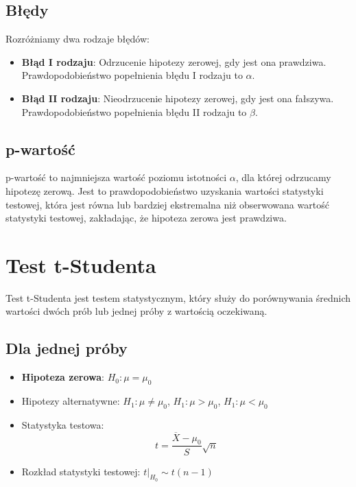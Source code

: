 \documentclass{../notatki}
\begin{document}
\subsection{Błędy}

Rozróżniamy dwa rodzaje błędów:
\begin{itemize}
  \item \textbf{Błąd I rodzaju}: Odrzucenie hipotezy zerowej, gdy jest ona
    prawdziwa. Prawdopodobieństwo popełnienia błędu I rodzaju to $\alpha$.
  \item \textbf{Błąd II rodzaju}: Nieodrzucenie hipotezy zerowej, gdy jest ona
    fałszywa. Prawdopodobieństwo popełnienia błędu II rodzaju to $\beta$.
\end{itemize}

\subsection{p-wartość}

p-wartość to najmniejsza wartość poziomu istotności $\alpha$, dla której
odrzucamy hipotezę zerową. Jest to prawdopodobieństwo uzyskania wartości
statystyki testowej, która jest równa lub bardziej ekstremalna niż
obserwowana wartość statystyki testowej, zakładając, że hipoteza zerowa jest
prawdziwa.

\section{Test t-Studenta}

Test t-Studenta jest testem statystycznym, który służy do porównywania średnich
wartości dwóch prób lub jednej próby z wartością oczekiwaną.

\subsection{Dla jednej próby}

\begin{itemize}
  \item \textbf{Hipoteza zerowa}: $H_0: \mu = \mu_0$
  \item Hipotezy alternatywne: $H_1: \mu \neq \mu_0$, $H_1: \mu >
    \mu_0$, $H_1: \mu < \mu_0$
  \item Statystyka testowa:
    $$
    t = \frac{\overline{X} - \mu_0}{S} \sqrt{n}
    $$
  \item Rozkład statystyki testowej: $t|_{H_0} \sim t(n-1)$
\end{itemize}
\end{document}
